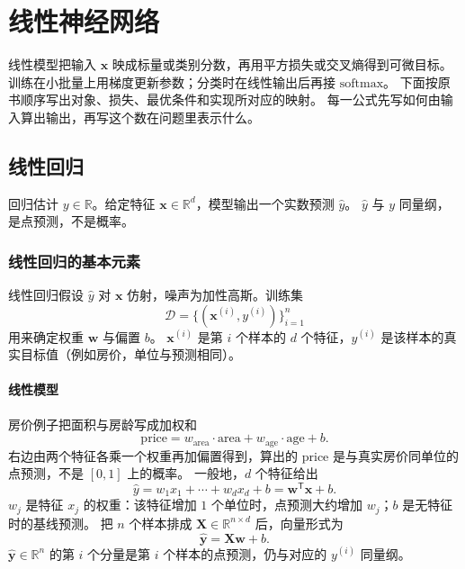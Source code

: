 \chapter{线性神经网络}

线性模型把输入 $\bm{x}$ 映成标量或类别分数，再用平方损失或交叉熵得到可微目标。
训练在小批量上用梯度更新参数；分类时在线性输出后再接 $\mathrm{softmax}$。
下面按原书顺序写出对象、损失、最优条件和实现所对应的映射。
每一公式先写如何由输入算出输出，再写这个数在问题里表示什么。

\section{线性回归}





回归估计 $y\in\mathbb{R}$。给定特征 $\bm{x}\in\mathbb{R}^{d}$，模型输出一个实数预测 $\hat{y}$。
$\hat{y}$ 与 $y$ 同量纲，是点预测，不是概率。

\subsection{线性回归的基本元素}

线性回归假设 $\hat{y}$ 对 $\bm{x}$ 仿射，噪声为加性高斯。训练集
\[
\mathcal{D}=\{(\bm{x}^{(i)},y^{(i)})\}_{i=1}^{n}
\]
用来确定权重 $\bm{w}$ 与偏置 $b$。
$\bm{x}^{(i)}$ 是第 $i$ 个样本的 $d$ 个特征，$y^{(i)}$ 是该样本的真实目标值（例如房价，单位与预测相同）。

\subsubsection{线性模型}

房价例子把面积与房龄写成加权和
\[
\mathrm{price}=w_{\mathrm{area}}\cdot\mathrm{area}+w_{\mathrm{age}}\cdot\mathrm{age}+b.
\]
右边由两个特征各乘一个权重再加偏置得到，算出的 $\mathrm{price}$ 是与真实房价同单位的点预测，不是 $[0,1]$ 上的概率。
一般地，$d$ 个特征给出
\[
\hat{y}=w_1 x_1+\cdots+w_d x_d+b=\bm{w}^{\mathsf T}\bm{x}+b.
\]
$w_j$ 是特征 $x_j$ 的权重：该特征增加 $1$ 个单位时，点预测大约增加 $w_j$；$b$ 是无特征时的基线预测。
把 $n$ 个样本排成 $\bm{X}\in\mathbb{R}^{n\times d}$ 后，向量形式为
\[
\hat{\bm{y}}=\bm{X}\bm{w}+b.
\]
$\hat{\bm{y}}\in\mathbb{R}^{n}$ 的第 $i$ 个分量是第 $i$ 个样本的点预测，仍与对应的 $y^{(i)}$ 同量纲。

